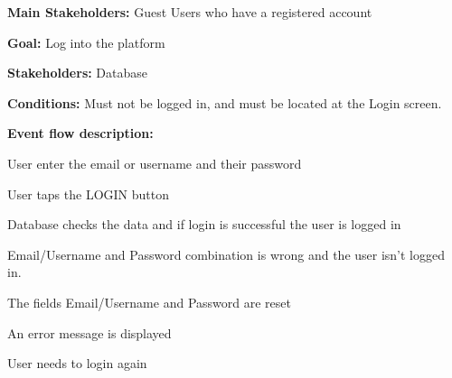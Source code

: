 				\noindent {}
				\begin{packed_item}
					\item \textbf{Main Stakeholders:} Guest Users who have a registered account
					\item \textbf{Goal:} Log into the platform
					\item \textbf{Stakeholders:} Database
					\item \textbf{Conditions:} Must not be logged in, and must be located at the Login screen.
					\item \textbf{Event flow description: }
					\begin{packed_enum}
						\item User enter the email or username and their password
						\item User taps the LOGIN button
						\item Database checks the data and if login is successful the user is logged in
					\end{packed_enum}
				
					\begin{packed_item}
						\item[3.a] Email/Username and Password combination is wrong and the user isn't logged in.
						\item[] \begin{packed_enum}
							\item The fields Email/Username and Password are reset
							\item An error message is displayed
							\item User needs to login again
						\end{packed_enum}
					\end{packed_item}
				\end{packed_item}
			
